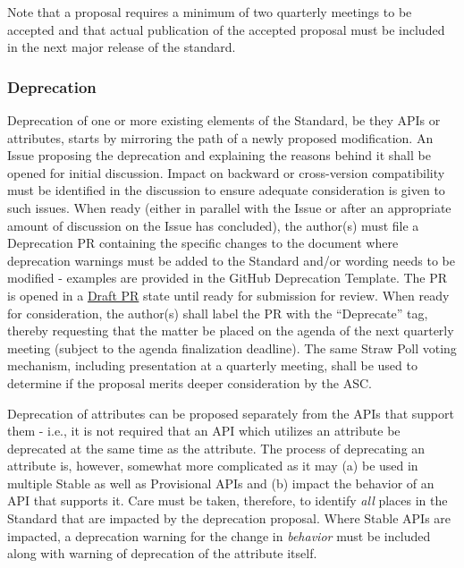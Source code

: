 \documentclass{article}
\begin{document}
Note that a proposal requires a minimum of two quarterly meetings to be
accepted and that actual publication of the accepted proposal must be
included in the next major release of the standard.

\hypertarget{deprecation}{%
\subsubsection{Deprecation}%
\label{deprecation}}

Deprecation of one or more existing elements of the Standard, be they
APIs or attributes, starts by mirroring the path of a newly proposed
modification. An Issue proposing the deprecation and explaining the
reasons behind it shall be opened for initial discussion. Impact on
backward or cross-version compatibility must be identified in the
discussion to ensure adequate consideration is given to such issues.
When ready (either in parallel with the Issue or after an appropriate
amount of discussion on the Issue has concluded), the author(s) must
file a Deprecation PR containing the specific changes to the document
where deprecation warnings must be added to the Standard and/or wording
needs to be modified - examples are provided in the GitHub Deprecation
Template. The PR is opened in a
\href{https://github.blog/2019-02-14-introducing-draft-pull-requests/}{Draft
PR} state until ready for submission for review. When ready for
consideration, the author(s) shall label the PR with the ``Deprecate''
tag, thereby requesting that the matter be placed on the agenda of the
next quarterly meeting (subject to the agenda finalization deadline). The same
Straw Poll voting mechanism, including presentation at a
quarterly meeting, shall be used to determine if the proposal merits
deeper consideration by the ASC.

Deprecation of attributes can be proposed separately from the APIs that
support them - i.e., it is not required that an API which utilizes an
attribute be deprecated at the same time as the attribute. The process
of deprecating an attribute is, however, somewhat more complicated as it
may (a) be used in multiple Stable as well as Provisional APIs
and (b) impact the behavior of an API that supports it. Care must be
taken, therefore, to identify \emph{all} places in the Standard that are
impacted by the deprecation proposal. Where Stable APIs are
impacted, a deprecation warning for the change in \emph{behavior} must
be included along with warning of deprecation of the attribute itself.
\end{document}
